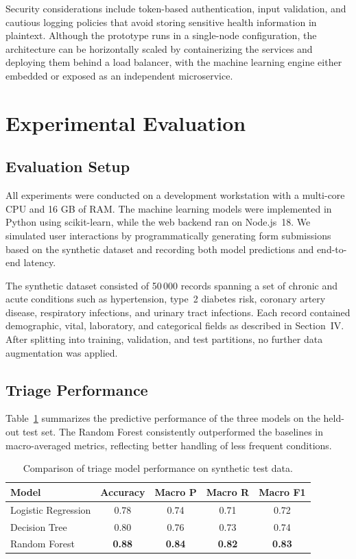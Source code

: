 \documentclass[conference]{IEEEtran}
\begin{document}
Security considerations include token-based authentication, input validation, and cautious logging policies that avoid storing sensitive health information in plaintext. Although the prototype runs in a single-node configuration, the architecture can be horizontally scaled by containerizing the services and deploying them behind a load balancer, with the machine learning engine either embedded or exposed as an independent microservice.

\section{Experimental Evaluation}

\subsection{Evaluation Setup}

All experiments were conducted on a development workstation with a multi-core CPU and 16 GB of RAM. The machine learning models were implemented in Python using scikit-learn, while the web backend ran on Node.js~18. We simulated user interactions by programmatically generating form submissions based on the synthetic dataset and recording both model predictions and end-to-end latency.

The synthetic dataset consisted of 50\,000 records spanning a set of chronic and acute conditions such as hypertension, type~2 diabetes risk, coronary artery disease, respiratory infections, and urinary tract infections. Each record contained demographic, vital, laboratory, and categorical fields as described in Section~IV. After splitting into training, validation, and test partitions, no further data augmentation was applied.

\subsection{Triage Performance}

Table~\ref{tab:performance} summarizes the predictive performance of the three models on the held-out test set. The Random Forest consistently outperformed the baselines in macro-averaged metrics, reflecting better handling of less frequent conditions.

\begin{table}[t]
    \centering
    \caption{Comparison of triage model performance on synthetic test data.}
    \label{tab:performance}
    \begin{tabular}{lcccc}
        \toprule
        Model & Accuracy & Macro P & Macro R & Macro F1 \\
        \midrule
        Logistic Regression & 0.78 & 0.74 & 0.71 & 0.72 \\
        Decision Tree       & 0.80 & 0.76 & 0.73 & 0.74 \\
        Random Forest       & \textbf{0.88} & \textbf{0.84} & \textbf{0.82} & \textbf{0.83} \\
        \bottomrule
    \end{tabular}
\end{table}
\end{document}
